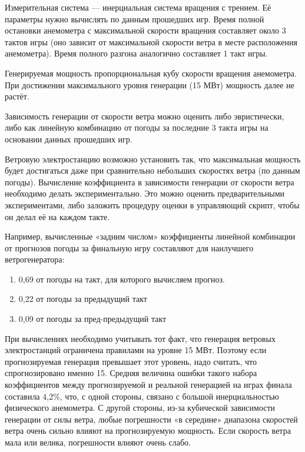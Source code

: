 Измерительная система — инерциальная система вращения с трением. Её параметры нужно вычислять по данным прошедших игр. Время полной остановки анемометра с максимальной скорости вращения составляет около 3 тактов игры (оно зависит от максимальной скорости ветра в месте расположения анемометра). Время полного разгона аналогично составляет 1 такт игры.

Генерируемая мощность пропорциональная кубу скорости вращения анемометра. При достижении максимального уровня генерации (15 МВт) мощность далее не растёт.

Зависимость генерации от скорости ветра можно оценить либо эвристически, либо как линейную комбинацию от погоды за последние 3 такта игры на основании данных прошедших игр.

Ветровую электростанцию возможно установить так, что максимальная мощность будет достигаться даже при сравнительно небольших скоростях ветра (по данным погоды). Вычисление коэффициента в зависимости генерации от скорости ветра необходимо делать экспериментально. Это можно оценить предварительными экспериментами, либо заложить процедуру оценки в управляющий скрипт, чтобы он делал её на каждом такте.

Например, вычисленные «задним числом» коэффициенты линейной комбинации от прогнозов погоды за финальную игру составляют для наилучшего ветрогенератора:

\begin{enumerate}
    \item 0,69 от погоды на такт, для которого вычисляем прогноз.
    \item 0,22 от погоды за предыдущий такт
    \item 0,09 от погоды за пред-предыдущий такт
\end{enumerate}

При вычислениях необходимо учитывать тот факт, что генерация ветровых электростанций ограничена правилами на уровне 15 МВт. Поэтому если прогнозируемая генерация превышает этот уровень, надо считать, что спрогнозировано именно 15.
Средняя величина ошибки такого набора коэффициентов между прогнозируемой и реальной генерацией на играх финала составила 4,2\%, что, с одной стороны, связано с большой инерциальностью физического анемометра. С другой стороны, из-за кубической зависимости генерации от силы ветра, любые погрешности «в середине» диапазона скоростей ветра очень сильно влияют на прогнозируемую мощность. Если скорость ветра мала или велика, погрешности влияют очень слабо.

